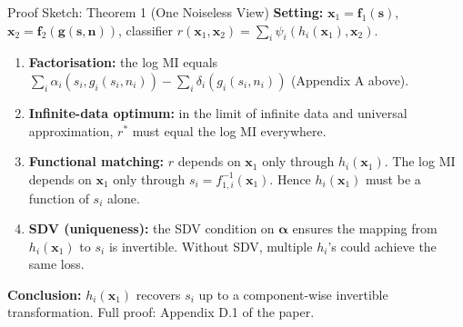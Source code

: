 \documentclass[aspectratio=169, 10pt]{beamer}
\begin{document}
\begin{frame}{Proof Sketch: Theorem 1 (One Noiseless View)}
  \textbf{Setting:} $\mathbf{x}_1=\mathbf{f}_1(\mathbf{s})$,
  $\mathbf{x}_2=\mathbf{f}_2(\mathbf{g}(\mathbf{s},\mathbf{n}))$,
  classifier $r(\mathbf{x}_1,\mathbf{x}_2)=\sum_i\psi_i(h_i(\mathbf{x}_1),\mathbf{x}_2)$.

  \medskip
  \begin{enumerate}
    \item \textbf{Factorisation:} the log MI equals
          $\sum_i\alpha_i(s_i,g_i(s_i,n_i))-\sum_i\delta_i(g_i(s_i,n_i))$
          (Appendix A above).
    \item \textbf{Infinite-data optimum:} in the limit of infinite data and universal
          approximation, $r^*$ must equal the log MI everywhere.
    \item \textbf{Functional matching:} $r$ depends on $\mathbf{x}_1$ only through
          $h_i(\mathbf{x}_1)$. The log MI depends on $\mathbf{x}_1$ only through
          $s_i = f_{1,i}^{-1}(\mathbf{x}_1)$. Hence $h_i(\mathbf{x}_1)$ must be a
          function of $s_i$ alone.
    \item \textbf{SDV (uniqueness):} the SDV condition on $\boldsymbol{\alpha}$ ensures
          the mapping from $h_i(\mathbf{x}_1)$ to $s_i$ is invertible. Without SDV,
          multiple $h_i$'s could achieve the same loss.
  \end{enumerate}

  \medskip
  \textbf{Conclusion:} $h_i(\mathbf{x}_1)$ recovers $s_i$ up to a component-wise
  invertible transformation. Full proof: Appendix D.1 of the paper.
\end{frame}
\end{document}

